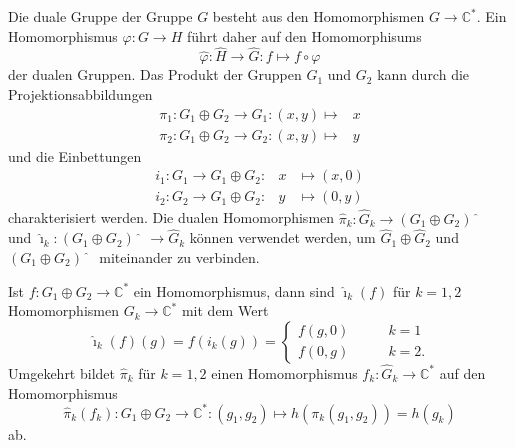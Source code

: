 Die duale Gruppe der Gruppe $G$ besteht aus den Homomorphismen
$G\to\mathbb{C}^*$.
Ein Homomorphismus $\varphi\colon G\to H$ führt daher auf den
Homomorphisums
\[
\hat{\varphi}
\colon
\hat{H}\to\hat{G}
:
f\mapsto f\circ \varphi
\]
der dualen Gruppen.
Das Produkt der Gruppen $G_1$ und $G_2$ kann durch die Projektionsabbildungen
\[
\renewcommand{\arraycolsep}{2pt}
\begin{array}{rl}
\pi_1 \colon G_1 \oplus G_2 \to G_1 : (x,y) \mapsto {}&x
\\
\pi_2 \colon G_1 \oplus G_2 \to G_2 : (x,y) \mapsto {}&y
\end{array}
\]
und die Einbettungen
\[
\renewcommand{\arraycolsep}{2pt}
\begin{array}{rcl}
i_1 \colon G_1 \to G_1\oplus G_2 : &x&\mapsto (x,0) \\
i_2 \colon G_2 \to G_1\oplus G_2 : &y&\mapsto (0,y) 
\end{array}
\]
charakterisiert werden.
Die dualen Homomorphismen
$\hat{\pi}_k\colon\hat{G}_k\to (G_1\oplus G_2)\hat{\phantom{\imath}}$
und
$\hat{\imath}_k\colon (G_1\oplus G_2)\hat{\phantom{\imath}}\to\hat{G}_k$
können verwendet werden, um $\hat{G}_1\oplus\hat{G}_2$ und
$(G_1\oplus G_2)\hat{\phantom{\imath}}$ miteinander zu verbinden.

Ist $f\colon G_1\oplus G_2\to\mathbb{C}^*$ ein Homomorphismus, dann 
sind $\hat{\imath}_k(f)$ für $k=1,2$ Homomorphismen $G_k\to\mathbb{C}^*$
mit dem Wert
\[
\hat{\imath}_k(f)(g)
=
f(i_k(g))
=
\begin{cases}
f(g,0)&\qquad k=1\\
f(0,g)&\qquad k=2.
\end{cases}
\]
Umgekehrt bildet $\hat{\pi}_k$ für $k=1,2$ einen Homomorphismus
$f_k\colon \hat{G}_k\to\mathbb{C}^*$ auf den
Homomorphismus
\[
\hat{\pi}_k(f_k)
\colon
G_1\oplus G_2
\to
\mathbb{C}^*
:
(g_1,g_2)
\mapsto
h(\pi_k(g_1,g_2)) = h(g_k)
\]
ab.

